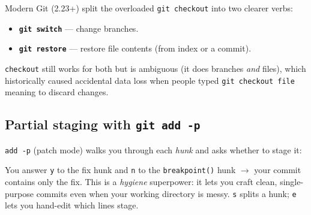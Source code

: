 \documentclass[11pt]{article}
\providecommand{\tightlist}{\setlength{\itemsep}{1pt}\setlength{\parskip}{0pt}}
\newenvironment{Shaded}{\begin{snugshade}}{\end{snugshade}}
\newcommand{\AttributeTok}[1]{\textcolor[rgb]{0.16,0.50,0.73}{#1}}
\newcommand{\BuiltInTok}[1]{\textcolor[rgb]{0.50,0.55,0.55}{#1}}
\newcommand{\CommentTok}[1]{\textcolor[rgb]{0.48,0.49,0.49}{#1}}
\newcommand{\ErrorTok}[1]{\textcolor[rgb]{0.85,0.27,0.33}{\underline{#1}}}
\newcommand{\ExtensionTok}[1]{\textcolor[rgb]{0.00,0.60,1.00}{\textbf{#1}}}
\newcommand{\KeywordTok}[1]{\textcolor[rgb]{0.81,0.81,0.76}{\textbf{#1}}}
\newcommand{\NormalTok}[1]{\textcolor[rgb]{0.81,0.81,0.76}{#1}}
\newcommand{\PreprocessorTok}[1]{\textcolor[rgb]{0.15,0.68,0.38}{#1}}
\newcommand{\SpecialStringTok}[1]{\textcolor[rgb]{0.85,0.27,0.33}{#1}}
\newcommand{\StringTok}[1]{\textcolor[rgb]{0.96,0.31,0.31}{#1}}
\begin{document}
Modern Git (2.23+) split the overloaded \texttt{git\ checkout} into two clearer verbs:

\begin{itemize}
\tightlist
\item
  \textbf{\texttt{git\ switch}} --- change branches.
\item
  \textbf{\texttt{git\ restore}} --- restore file contents (from index or a commit).
\end{itemize}

\texttt{checkout} still works for both but is ambiguous (it does branches \emph{and} files), which historically caused accidental data loss when people typed \texttt{git\ checkout\ file} meaning to discard changes.

\subsection{\texorpdfstring{Partial staging with \texttt{git\ add\ -p}}{Partial staging with git add -p}}\label{partial-staging-with-git-add--p}

\texttt{add\ -p} (patch mode) walks you through each \emph{hunk} and asks whether to stage it:


\begin{Shaded}
\end{Shaded}

You answer \texttt{y} to the fix hunk and \texttt{n} to the \texttt{breakpoint()} hunk \(\rightarrow\) your commit contains only the fix. This is a \emph{hygiene} superpower: it lets you craft clean, single-purpose commits even when your working directory is messy. \texttt{s} splits a hunk; \texttt{e} lets you hand-edit which lines stage.
\end{document}
